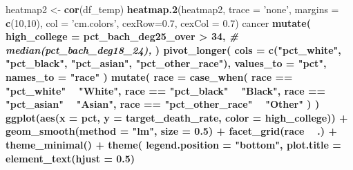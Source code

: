 \documentclass[
  11pt,
]{article}
\newenvironment{Shaded}{\begin{snugshade}}{\end{snugshade}}
\newcommand{\CommentTok}[1]{\textcolor[rgb]{0.56,0.35,0.01}{\textit{#1}}}
\newcommand{\DataTypeTok}[1]{\textcolor[rgb]{0.13,0.29,0.53}{#1}}
\newcommand{\DecValTok}[1]{\textcolor[rgb]{0.00,0.00,0.81}{#1}}
\newcommand{\FloatTok}[1]{\textcolor[rgb]{0.00,0.00,0.81}{#1}}
\newcommand{\KeywordTok}[1]{\textcolor[rgb]{0.13,0.29,0.53}{\textbf{#1}}}
\newcommand{\NormalTok}[1]{#1}
\newcommand{\OperatorTok}[1]{\textcolor[rgb]{0.81,0.36,0.00}{\textbf{#1}}}
\newcommand{\StringTok}[1]{\textcolor[rgb]{0.31,0.60,0.02}{#1}}
\begin{document}
\begin{Shaded}
\begin{Highlighting}[]
{{{{{{{{{{{{{{{{{\NormalTok{heatmap2 <-}\StringTok{ }\KeywordTok{cor}\NormalTok{(df_temp)}
\KeywordTok{heatmap.2}\NormalTok{(heatmap2, }\DataTypeTok{trace =} \StringTok{'none'}\NormalTok{, }\DataTypeTok{margins =} \KeywordTok{c}\NormalTok{(}\DecValTok{10}\NormalTok{,}\DecValTok{10}\NormalTok{), }\DataTypeTok{col =} \StringTok{'cm.colors'}\NormalTok{, }\DataTypeTok{cexRow=}\FloatTok{0.7}\NormalTok{, }\DataTypeTok{cexCol =} \FloatTok{0.7}\NormalTok{)}
\NormalTok{cancer }\OperatorTok{%
\StringTok{  }\KeywordTok{mutate}\NormalTok{(}
    \DataTypeTok{high_college =}\NormalTok{ pct_bach_deg25_over }\OperatorTok{>}\StringTok{ }\DecValTok{34}\NormalTok{, }\CommentTok{# median(pct_bach_deg18_24),}
\NormalTok{  ) }\OperatorTok{%
\StringTok{  }\KeywordTok{pivot_longer}\NormalTok{(}
    \DataTypeTok{cols =} \KeywordTok{c}\NormalTok{(}\StringTok{"pct_white"}\NormalTok{, }
             \StringTok{"pct_black"}\NormalTok{, }
             \StringTok{"pct_asian"}\NormalTok{,}
             \StringTok{"pct_other_race"}\NormalTok{),}
    \DataTypeTok{values_to =} \StringTok{"pct"}\NormalTok{,}
    \DataTypeTok{names_to =} \StringTok{"race"}
\NormalTok{  ) }\OperatorTok{%
\StringTok{  }\KeywordTok{mutate}\NormalTok{(}
    \DataTypeTok{race =} \KeywordTok{case_when}\NormalTok{(}
\NormalTok{      race }\OperatorTok{==}\StringTok{ "pct_white"} \OperatorTok{~}\StringTok{ "White"}\NormalTok{,}
\NormalTok{      race }\OperatorTok{==}\StringTok{ "pct_black"} \OperatorTok{~}\StringTok{ "Black"}\NormalTok{,}
\NormalTok{      race }\OperatorTok{==}\StringTok{ "pct_asian"} \OperatorTok{~}\StringTok{ "Asian"}\NormalTok{,}
\NormalTok{      race }\OperatorTok{==}\StringTok{ "pct_other_race"} \OperatorTok{~}\StringTok{ "Other"}
\NormalTok{    )}
\NormalTok{  ) }\OperatorTok{%
\StringTok{  }\KeywordTok{ggplot}\NormalTok{(}\KeywordTok{aes}\NormalTok{(}\DataTypeTok{x =}\NormalTok{ pct, }\DataTypeTok{y =}\NormalTok{ target_death_rate, }\DataTypeTok{color =}\NormalTok{ high_college)) }\OperatorTok{+}\StringTok{ }
\StringTok{  }\KeywordTok{geom_smooth}\NormalTok{(}\DataTypeTok{method =} \StringTok{"lm"}\NormalTok{, }\DataTypeTok{size =} \FloatTok{0.5}\NormalTok{) }\OperatorTok{+}
\StringTok{  }\KeywordTok{facet_grid}\NormalTok{(race }\OperatorTok{~}\StringTok{ }\NormalTok{.) }\OperatorTok{+}
\StringTok{  }\KeywordTok{theme_minimal}\NormalTok{() }\OperatorTok{+}
\StringTok{  }\KeywordTok{theme}\NormalTok{(}
    \DataTypeTok{legend.position =} \StringTok{"bottom"}\NormalTok{,}
    \DataTypeTok{plot.title =} \KeywordTok{element_text}\NormalTok{(}\DataTypeTok{hjust =} \FloatTok{0.5}\NormalTok{)}
}}}}}}}}}}}}}}}}}}}}}
\end{Highlighting}
\end{Shaded}
\end{document}
